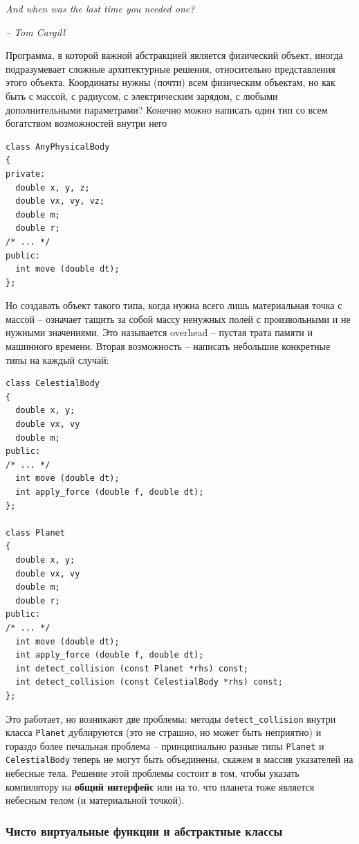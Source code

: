 \documentclass[a4paper,12pt,oneside]{article}
\begin{document}
\hfill\textit{And when was the last time you needed one?}{\vspace{0.5em}}

\hfill\textit{-- Tom Cargill}

Программа, в которой важной абстракцией является физический объект, иногда подразумевает сложные архитектурные решения, относительно представления этого объекта. Координаты нужны (почти) всем физическим объектам, но как быть с массой, с радиусом, с электрическим зарядом, с любыми дополнительными параметрами? Конечно можно написать один тип со всем богатством возможностей внутри него

\begin{lstlisting}
class AnyPhysicalBody
{
private:
  double x, y, z;
  double vx, vy, vz;
  double m;
  double r;
/* ... */
public:
  int move (double dt);
};
\end{lstlisting}

Но создавать объект такого типа, когда нужна всего лишь материальная точка с массой -- означает тащить за собой массу ненужных полей с произвольными и не нужными значениями. Это называется overhead -- пустая трата памяти и машинного времени. Вторая возможность -- написать небольшие конкретные типы на каждый случай:

\begin{lstlisting}
class CelestialBody
{
  double x, y;
  double vx, vy
  double m;
public:
/* ... */
  int move (double dt);
  int apply_force (double f, double dt);
};

class Planet
{
  double x, y;
  double vx, vy
  double m;
  double r;
public:
/* ... */
  int move (double dt);
  int apply_force (double f, double dt);
  int detect_collision (const Planet *rhs) const;
  int detect_collision (const CelestialBody *rhs) const;
};
\end{lstlisting}

Это работает, но возникают две проблемы: методы \lstinline!detect_collision! внутри класса \lstinline!Planet! дублируются (это не страшно, но может быть неприятно) и гораздо более печальная проблема -- принципиально разные типы \lstinline!Planet! и \lstinline!CelestialBody! теперь не могут быть объединены, скажем в массив указателей на небесные тела. Решение этой проблемы состоит в том, чтобы указать компилятору на \textbf{общий интерфейс} или на то, что планета тоже является небесным телом (и материальной точкой).

\subsubsection{Чисто виртуальные функции и абстрактные классы}\label{PureVirtual}
\end{document}
